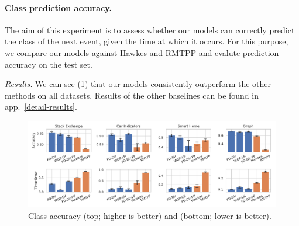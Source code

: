 \vspace{3mm}
\paragraph{Class prediction accuracy.} The aim of this experiment is to assess whether our models can correctly predict the class of the next event, given the time at which it occurs. For this purpose, we compare our models against Hawkes and RMTPP and evalute prediction accuracy on the test set.

\textit{Results.} We can see (\cref{fig:accuracy}) that our models consistently outperform the other methods on all datasets. Results of the other baselines can be found in app.~\ref{detail-results}.


\begin{figure}
\centering
    \includegraphics[width=\linewidth]{sections/010_neurips2019/paper/images/accuracy-final.pdf}
    \vspace*{-0.7cm}
    \caption{Class accuracy (top; higher is better) and \TimeScore (bottom; lower is better).}
    \label{fig:accuracy}
    \vspace*{-0.3cm}
\end{figure}

